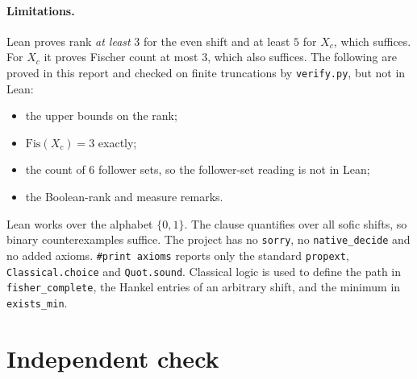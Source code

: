 \documentclass[11pt]{article}
\theoremstyle{definition}
\theoremstyle{remark}
\begin{document}
\paragraph{Limitations.} Lean proves rank \emph{at least} $3$ for the even shift
and at least $5$ for $X_c$, which suffices. For $X_c$ it proves Fischer count at
most $3$, which also suffices. The following are proved in this report and checked
on finite truncations by \texttt{verify.py}, but not in Lean:
\begin{itemize}
\item the upper bounds on the rank;
\item $\mathrm{Fis}(X_c)=3$ exactly;
\item the count of $6$ follower sets, so the follower-set reading is not in Lean;
\item the Boolean-rank and measure remarks.
\end{itemize}
Lean works over the alphabet $\{0,1\}$. The clause quantifies over all sofic shifts,
so binary counterexamples suffice. The project has no \texttt{sorry}, no
\texttt{native\_decide} and no added axioms. \texttt{\#print axioms} reports only
the standard \texttt{propext}, \texttt{Classical.choice} and \texttt{Quot.sound}.
Classical logic is used to define the path in \texttt{fisher\_complete}, the Hankel
entries of an arbitrary shift, and the minimum in \texttt{exists\_min}.

\endgroup

\section{Independent check}
\end{document}
